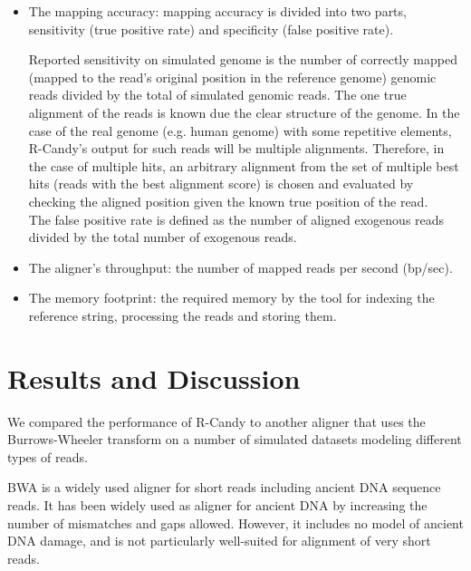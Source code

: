 \documentclass[11pt,a4paper]{report}
\begin{document}
\begin{itemize}

 \item The mapping accuracy: mapping accuracy is divided into two parts, 
 sensitivity (true positive rate) and specificity (false positive rate).

Reported sensitivity on simulated genome is the number of correctly mapped
(mapped to the read's original position in the reference genome) genomic reads 
divided by the total of simulated genomic reads. The one true alignment of the
reads is known due the clear structure of the genome. In the case of the real 
genome (e.g. human genome) with some repetitive elements, R-Candy's output for 
such reads will be multiple alignments. Therefore, in the case of multiple hits, 
an arbitrary alignment from the set of multiple best hits (reads with the best 
alignment score) is chosen and evaluated by checking the aligned position given 
the known true position of the read.\\

The false positive rate is defined as the number of aligned exogenous reads 
divided by the total number of exogenous reads.

 \item The aligner's throughput: the number of mapped reads per second (bp/sec).

 \item The memory footprint: the required memory by the tool for indexing the 
reference string, processing the reads and storing them. 

\end{itemize}
 




\section{Results and Discussion} \label{Results and Discussion}

We compared the performance of R-Candy to another aligner that uses the 
Burrows-Wheeler transform\cite{bwa} on a number of simulated datasets modeling 
different types of reads. 

BWA is a widely used aligner for short reads including ancient DNA sequence 
reads. It has been widely used as aligner for ancient DNA by increasing the 
number of mismatches and gaps allowed. However, it includes no model of ancient 
DNA damage, and is not particularly well-suited for alignment of very short reads.
\end{document}
